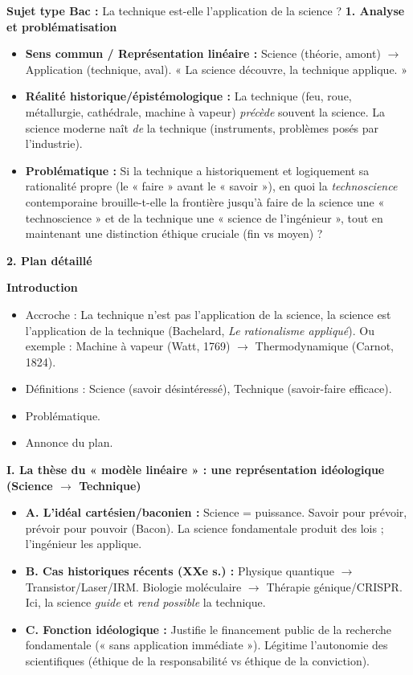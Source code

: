 \documentclass[11pt]{article}
\begin{document}
\begin{exoresolu}
    \textbf{Sujet type Bac :} \guillemotleft La technique est-elle l'application de la science ? \guillemotright
    \tcblower
    \textbf{1. Analyse et problématisation}
    \begin{itemize}
        \item \textbf{Sens commun / Représentation linéaire :} Science (théorie, amont) $\rightarrow$ Application (technique, aval). « La science découvre, la technique applique. »
        \item \textbf{Réalité historique/épistémologique :} La technique (feu, roue, métallurgie, cathédrale, machine à vapeur) \emph{précède} souvent la science. La science moderne naît \emph{de} la technique (instruments, problèmes posés par l'industrie).
        \item \textbf{Problématique :} Si la technique a historiquement et logiquement sa rationalité propre (le « faire » avant le « savoir »), en quoi la \emph{technoscience} contemporaine brouille-t-elle la frontière jusqu'à faire de la science une « technoscience » et de la technique une « science de l'ingénieur », tout en maintenant une distinction éthique cruciale (fin vs moyen) ?
    \end{itemize}

    \textbf{2. Plan détaillé}

    \textbf{Introduction}
    \begin{itemize}
        \item Accroche : \guillemotleft La technique n'est pas l'application de la science, la science est l'application de la technique \guillemotright (Bachelard, \emph{Le rationalisme appliqué}). Ou exemple : Machine à vapeur (Watt, 1769) $\rightarrow$ Thermodynamique (Carnot, 1824).
        \item Définitions : Science (savoir désintéressé), Technique (savoir-faire efficace).
        \item Problématique.
        \item Annonce du plan.
    \end{itemize}

    \textbf{I. La thèse du « modèle linéaire » : une représentation idéologique (Science $\rightarrow$ Technique)}
    \begin{itemize}
        \item \textbf{A. L'idéal cartésien/baconien :} Science = puissance. \guillemotleft Savoir pour prévoir, prévoir pour pouvoir \guillemotright (Bacon). La science fondamentale produit des lois ; l'ingénieur les applique.
        \item \textbf{B. Cas historiques récents (XXe s.) :} Physique quantique $\rightarrow$ Transistor/Laser/IRM. Biologie moléculaire $\rightarrow$ Thérapie génique/CRISPR. Ici, la science \emph{guide} et \emph{rend possible} la technique.
        \item \textbf{C. Fonction idéologique :} Justifie le financement public de la recherche fondamentale (« sans application immédiate »). Légitime l'autonomie des scientifiques (éthique de la responsabilité vs éthique de la conviction).
    \end{itemize}


\end{exoresolu}
\end{document}
